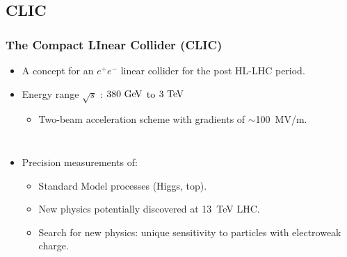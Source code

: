 \subsection{CLIC}
\begin{frame}
  \frametitle{The Compact LInear Collider (CLIC)}

 
  \begin{itemize}
  \item A concept for an $e^{+}e^{-}$ linear collider for the post
    HL-LHC period.
  \item Energy range $\sqrt{s}$ : \textcolor{blue}{$380\,\mathrm{\,Ge\kern -0.1em V}$} to
    \textcolor{blue}{$3\,\mathrm{\,Te\kern -0.1em V}$}
    \begin{itemize} 
    \item Two-beam acceleration scheme with gradients of $\sim$100~MV/m.
    \end{itemize}
  \end{itemize}
  
  \begin{columns} 
    
    \begin{itemize}
    \item Precision measurements of:
      \begin{itemize}
      \item Standard Model processes (Higgs, top).
      \item New physics potentially discovered at 13~TeV LHC.
      \item Search for new physics: unique sensitivity to particles with
        electroweak charge.
      \end{itemize}
    \end{itemize}

     \centering
  \end{columns}

\end{frame}

